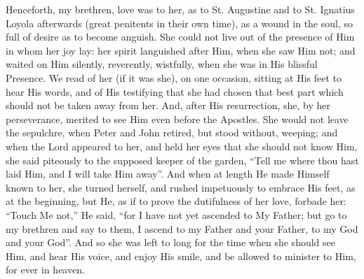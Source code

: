 Henceforth, my brethren, love was to her, as to St. Augustine and
to St. Ignatius Loyola afterwards (great penitents in their own time),
as a wound in the soul, so full of desire as to become anguish. She
could not live out of the presence of Him in whom her joy lay: her
spirit languished after Him, when she saw Him not; and waited on Him
silently, reverently, wistfully, when she was in His blissful
Presence. We read of her (if it was she), on one occasion, sitting at
His feet to hear His words, and of His testifying that she had chosen
that best part which should not be taken away from her. And, after His
resurrection, she, by her perseverance, merited to see Him even before
the Apostles. She would not leave the sepulchre, when Peter and John
retired, but stood without, weeping; and when the Lord appeared to
her, and held her eyes that she should not know Him, she said
piteously to the supposed keeper of the garden, ``Tell me where
thou hast laid Him, and I will take Him away''. And when at length
He made Himself known to her, she turned herself, and rushed
impetuously to embrace His feet, as at the beginning, but He, as if to
prove the dutifulness of her love, forbade her: ``Touch Me
not,'' He said, ``for I have not yet ascended to My Father;
but go to my brethren and say to them, I ascend to my Father and your
Father, to my God and your God''. And so she was left to long for
the time when she should see Him, and hear His voice, and enjoy His
smile, and be allowed to minister to Him, for ever in heaven.

